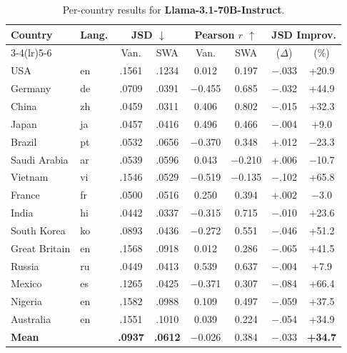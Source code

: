 \documentclass{article}
\newcommand{\gain}[1]{\textcolor{improvegreen}{#1}}
\newcommand{\loss}[1]{\textcolor{worsered}{#1}}
\begin{document}
\begin{table}[h]
\caption{Per-country results for \textbf{Llama-3.1-70B-Instruct}.}
\label{tab:llama70b_percountry}
\centering\setlength{\tabcolsep}{3.5pt}\footnotesize
\begin{tabular}{llcccccc}
\toprule
Country & Lang. & \multicolumn{2}{c}{JSD $\downarrow$} & \multicolumn{2}{c}{Pearson $r$ $\uparrow$} & \multicolumn{2}{c}{JSD Improv.} \\
\cmidrule(lr){3-4}\cmidrule(lr){5-6}
 & & Van. & SWA & Van. & SWA & ($\Delta$) & (\%) \\
\midrule
USA & en &.1561 &.1234 & 0.012 & 0.197 & $-$.033 & \gain{+20.9} \\
Germany & de &.0709 &.0391 & $-$0.455 & 0.685 & $-$.032 & \gain{+44.9} \\
China & zh &.0459 &.0311 & 0.406 & 0.802 & $-$.015 & \gain{+32.3} \\
Japan & ja &.0457 &.0416 & 0.496 & 0.466 & $-$.004 & \gain{+9.0} \\
Brazil & pt &.0532 &.0656 & $-$0.370 & 0.348 & +.012 & \loss{$-$23.3} \\
Saudi Arabia& ar &.0539 &.0596 & 0.043 & $-$0.210 & +.006 & \loss{$-$10.7} \\
Vietnam & vi &.1546 &.0529 & $-$0.519 & $-$0.135 & $-$.102 & \gain{+65.8} \\
France & fr &.0500 &.0516 & 0.250 & 0.394 & +.002 & \loss{$-$3.0} \\
India & hi &.0442 &.0337 & $-$0.315 & 0.715 & $-$.010 & \gain{+23.6} \\
South Korea & ko &.0893 &.0436 & $-$0.272 & 0.551 & $-$.046 & \gain{+51.2} \\
Great Britain& en&.1568 &.0918 & 0.012 & 0.286 & $-$.065 & \gain{+41.5} \\
Russia & ru &.0449 &.0413 & 0.539 & 0.637 & $-$.004 & \gain{+7.9} \\
Mexico & es &.1265 &.0425 & $-$0.371 & 0.307 & $-$.084 & \gain{+66.4} \\
Nigeria & en &.1582 &.0988 & 0.109 & 0.497 & $-$.059 & \gain{+37.5} \\
Australia & en &.1551 &.1010 & 0.039 & 0.224 & $-$.054 & \gain{+34.9} \\
\midrule
\textbf{Mean} & & \textbf{.0937} & \textbf{.0612} & $-$0.026 & 0.384 & $-$.033 & \gain{\textbf{+34.7}} \\
\bottomrule
\end{tabular}
\end{table}
\end{document}
